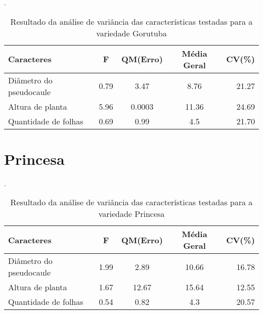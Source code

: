 \begin{table}[!htb]
	\begin{center}
		\caption{Resultado da análise de variância das características testadas para a variedade Gorutuba}.
		\begin{tabular*}{\textwidth}{@{\extracolsep{\fill}}lcccr}
			\toprule
			\toprule
			\textbf{Caracteres} & \textbf{F}  & \textbf{QM(Erro)} & \textbf{Média Geral} &\textbf {CV(\%)} \\
			\hline
			Diâmetro do pseudocaule & 0.79 & 3.47 & 8.76 & 21.27\\
			Altura de planta 		& 5.96 & 0.0003 & 11.36 & 24.69\\
			Quantidade de folhas 	& 0.69 & 0.99 & 4.5 & 21.70\\
			\hline
			\hline
		\end{tabular*}
	\end{center}
\end{table}

\section{Princesa}
\begin{table}[!htb]
	\begin{center}
		\caption{Resultado da análise de variância das características testadas para a variedade Princesa}.
		\begin{tabular*}{\textwidth}{@{\extracolsep{\fill}}lcccr}
			\toprule
			\toprule
			\textbf{Caracteres} & \textbf{F}  & \textbf{QM(Erro)} & \textbf{Média Geral} &\textbf {CV(\%)} \\
			\hline
			Diâmetro do pseudocaule & 1.99 & 2.89 & 10.66 & 16.78\\ 
			Altura de planta 		& 1.67 & 12.67 & 15.64 & 12.55\\
			Quantidade de folhas 	& 0.54 & 0.82 & 4.3 & 20.57\\
			\hline
			\hline
		\end{tabular*}
	\end{center}
\end{table}


